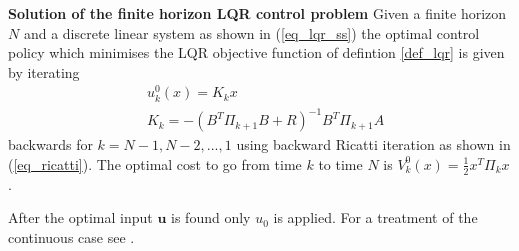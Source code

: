 \begin{thrm}
\textbf{Solution of the finite horizon LQR control problem} Given a finite horizon $N$ and a discrete linear system as shown in (\ref{eq_lqr_ss}) the optimal control policy which minimises the LQR objective function of defintion \ref{def_lqr} is given by iterating  
\begin{equation}
\begin{aligned}
&u^0_{k}(x) = K_{k}x \\
&K_k = -(B^T\Pi_{k+1}B+R)^{-1}B^T\Pi_{k+1}A
\end{aligned}
\label{eq_lqr_opt_control}
\end{equation}
backwards for $k=N-1, N-2, ..., 1$ using backward Ricatti iteration as shown in (\ref{eq_ricatti}). The optimal cost to go from time $k$ to time $N$ is $V^0_{k}(x)=\frac{1}{2}x^T\Pi_{k}x$.
\label{thrm_lqr_sol}
\end{thrm}
After the optimal input $\mathbf{u}$ is found only $u_0$ is applied. For a treatment of the continuous case see \cite{robust}.

